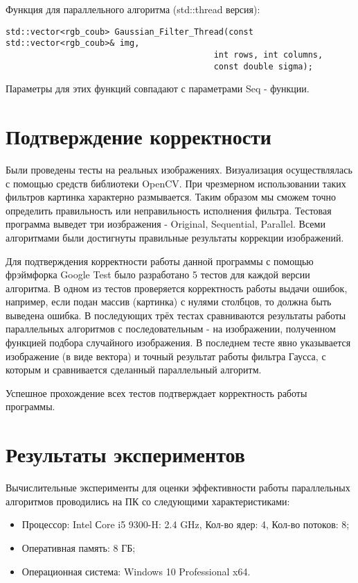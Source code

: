 \documentclass{report}
\begin{document}
\par Функция для параллельного алгоритма (std::thread версия):
\begin{lstlisting}
std::vector<rgb_coub> Gaussian_Filter_Thread(const std::vector<rgb_coub>& img,
                                          int rows, int columns,
                                          const double sigma);
\end{lstlisting}
Параметры для этих функций совпадают с параметрами Seq - функции.
\newpage

\section*{Подтверждение корректности}
Были проведены тесты на реальных изображениях. Визуализация осуществлялась с помощью средств библиотеки OpenCV. При чрезмерном использовании таких фильтров картинка характерно размывается. Таким образом мы сможем точно определить правильность или неправильность исполнения фильтра. Тестовая программа выведет три иозбражения - Original, Sequential, Parallel. Всеми алгоритмами были достигнуты правильные результаты коррекции изображений.
\par Для подтверждения корректности работы данной программы с помощью фрэймфорка Google Test было разработано 5 тестов для каждой версии алгоритма. В одном из тестов проверяется корректность работы выдачи ошибок, например, если подан массив (картинка) с нулями столбцов, то должна быть выведена ошибка. В последующих трёх тестах сравниваются результаты работы параллельных алгоритмов с последовательным - на изображении, полученном функцией подбора случайного изображения. В последнем тесте явно указывается изображение (в виде вектора) и точный результат работы фильтра Гаусса, с которым и сравнивается сделанный параллельный алгоритм.
\par Успешное прохождение всех тестов подтверждает корректность работы программы.
\newpage

\section*{Результаты экспериментов}
Вычислительные эксперименты для оценки эффективности работы параллельных алгоритмов проводились на ПК со следующими характеристиками:
\begin{itemize}
\item Процессор: Intel Сore i5 9300-H: 2.4 GHz, Кол-во ядер: 4, Кол-во потоков: 8;
\item Оперативная память: 8 ГБ;
\item Операционная система: Windows 10 Professional x64.
\end{itemize}
\end{document}
